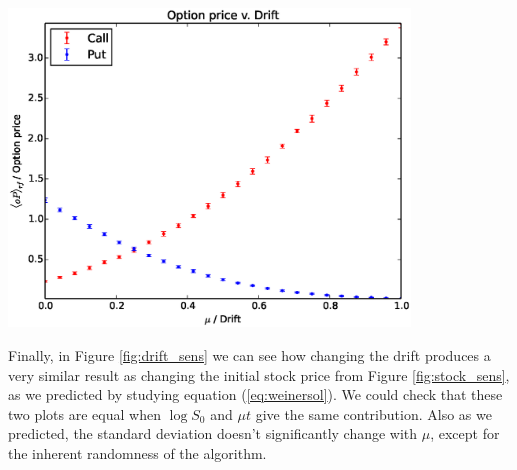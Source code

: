 \documentclass[8 pt]{article}
\newenvironment{Figure}
  {\par\medskip\noindent\minipage{\linewidth}}
  {\endminipage\par\medskip}
\begin{document}
\begin{multicols*}{2}
\begin{Figure}
  \begin{center}
    \includegraphics[width=0.8\textwidth]{graphs/oP_drift.eps}
    \label{fig:drift_sens}
  \end{center}
\end{Figure}

Finally, in Figure \ref{fig:drift_sens} we can see how changing the drift produces a very similar result as changing the initial stock price from Figure \ref{fig:stock_sens}, as we predicted by studying equation (\ref{eq:weinersol}). We could check that these two plots are equal when $\log S_0$ and $\mu t$ give the same contribution. Also as we predicted, the standard deviation doesn't significantly change with $\mu$, except for the inherent randomness of the algorithm.


\end{multicols*}
\end{document}
